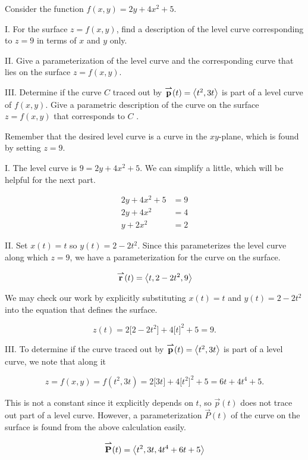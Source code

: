 \documentclass[noauthor]{ximera}
\begin{document}


\begin{problem}
Consider the function $f(x,y) = 2y+4x^2+5$.

I. For the surface $z=f(x,y)$, find a description of the level curve corresponding to $z=9$ in terms of $x$ and $y$ only.

II. Give a parameterization of the level curve and the corresponding curve that lies on the surface $z=f(x,y)$.

III. Determine if the curve $C$ traced out by ${\overset{\boldsymbol{\rightharpoonup}}{\mathbf{p}}}(t) = \left\langle t^2,3t\right\rangle$ is part of a level curve of $f(x,y)$.  Give a parametric description of the curve on the surface $z=f(x,y)$ that corresponds to $C$ .

\begin{freeResponse}
Remember that the desired  level curve is a curve in the $xy$-plane, which is found by setting $z=9$.

I. The level curve is $9 =2y+4x^2+5$.  We can simplify a little, which will be helpful for the next part.

\begin{align*}
2y+4x^2+5 &=9 \\
2y+4x^2 &= 4 \\
y+2x^2 &= 2
\end{align*}

II. Set $x(t)=t$ so $y(t) =2-2t^2$. Since this parameterizes the level curve along which $z=9$, we have a parameterization for the curve on the surface.

\[
{\overset{\boldsymbol{\rightharpoonup}}{\mathbf{r}}}(t) = \left\langle t,2-2t^2,9\right\rangle
\]

\begin{remark}
We may check our work by explicitly substituting $x(t)=t$ and $y(t) = 2-2t^2$ into the equation that defines the surface.  

\[z(t) = 2\big[2-2t^2\big] +4 \big[t\big]^2+5 = 9.\]

\end{remark}

III. To determine if the curve traced out by ${\overset{\boldsymbol{\rightharpoonup}}{\mathbf{p}}}(t) = \left\langle t^2,3t\right\rangle$ is part of a level curve, we note that along it

\[
z=f(x,y)=f(t^2,3t) = 2\big[3t\big]+4\big[ t^2 \big]^2+5 = 6t+4t^4+5.
\]

This is not a constant since it explicitly depends on $t$, so $\vec{p}(t)$ does not trace out part of a level curve.  However, a parameterization $\vec{P}(t)$ of the curve on the surface is found from the above calculation easily.

\[
{\overset{\boldsymbol{\rightharpoonup}}{\mathbf{P}}}(t) = \left\langle t^2,3t,4t^4+6t+5\right\rangle
\]
\end{freeResponse}
\end{problem}

\end{document}
